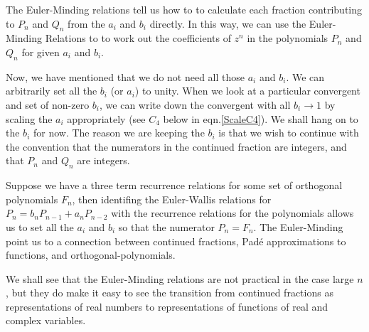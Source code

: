 \documentclass[16pt]{article}
\numberwithin{equation}{section}
\numberwithin{figure}{section}
\numberwithin{figure}{section}
\numberwithin{equation}{section}
\begin{document}
The Euler-Minding relations tell us how to to calculate each fraction contributing 
to $P_n$ and 
$Q_n$  from the $a_i$ and $b_i$ directly.
In this way, we can use the Euler-Minding Relations to to work out the
 coefficients of $z^n$ in the polynomials
$P_n$ and $Q_n$ for given $a_i$ and $b_i$.

Now, we have mentioned that we do not need all those $a_i$ and $b_i$. We can arbitrarily
set all the $b_i$ (or $a_i$) to unity. When we look at a particular convergent 
and set of non-zero $b_i$, we can write down the convergent with all $b_i\rightarrow 1$
 by scaling the $a_i$ appropriately (see $C_4$ below in eqn.\ref{ScaleC4}).
 We shall hang on to the $b_i$ for now. The reason we are keeping the $b_i$
 is that we wish to continue with the convention that the numerators in the
continued fraction are integers, and that $P_n$ and $Q_n$ are integers.

Suppose we have a three term recurrence relations for some set of orthogonal polynomials $F_n$,
then identifing the Euler-Wallis relations for $P_n=b_n P_{n-1}+a_n P_{n-2}$ with
the recurrence relations for the polynomials allows us to set all the $a_i$ and $b_i$
 so that the numerator $P_n=F_n$. The Euler-Minding point us to a connection between
continued fractions, Pad{\'e} approximations to functions, and orthogonal-polynomials.

We shall see that the Euler-Minding relations are not  practical in the case large $n$,
 but they do make it easy to see the transition from continued fractions as representations
 of real numbers to representations of functions of real and complex variables.
\end{document}
